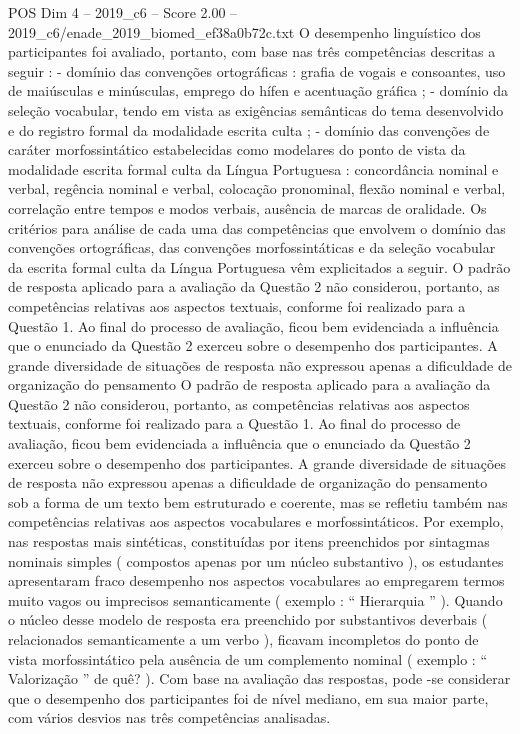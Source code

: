 \begin{textsample}{POS Dim 4 – 2019\_c6 – Score 2.00 – 2019\_c6/enade\_2019\_biomed\_ef38a0b72c.txt}
O desempenho linguístico dos participantes foi avaliado, portanto, com base nas três competências descritas a seguir : - domínio das convenções ortográficas : grafia de vogais e consoantes, uso de maiúsculas e minúsculas, emprego do hífen e acentuação gráfica ; - domínio da seleção vocabular, tendo em vista as exigências semânticas do tema desenvolvido e do registro formal da modalidade escrita culta ; - domínio das convenções de caráter morfossintático estabelecidas como modelares do ponto de vista da modalidade escrita formal culta da Língua Portuguesa : concordância nominal e verbal, regência nominal e verbal, colocação pronominal, flexão nominal e verbal, correlação entre tempos e modos verbais, ausência de marcas de oralidade.
Os critérios para análise de cada uma das competências que envolvem o domínio das convenções ortográficas, das convenções morfossintáticas e da seleção vocabular da escrita formal culta da Língua Portuguesa vêm explicitados a seguir.
O padrão de resposta aplicado para a avaliação da Questão 2 não considerou, portanto, as competências relativas aos aspectos textuais, conforme foi realizado para a Questão 1.
Ao final do processo de avaliação, ficou bem evidenciada a influência que o enunciado da Questão 2 exerceu sobre o desempenho dos participantes.
A grande diversidade de situações de resposta não expressou apenas a dificuldade de organização do pensamento O padrão de resposta aplicado para a avaliação da Questão 2 não considerou, portanto, as competências relativas aos aspectos textuais, conforme foi realizado para a Questão 1.
Ao final do processo de avaliação, ficou bem evidenciada a influência que o enunciado da Questão 2 exerceu sobre o desempenho dos participantes.
A grande diversidade de situações de resposta não expressou apenas a dificuldade de organização do pensamento sob a forma de um texto bem estruturado e coerente, mas se refletiu também nas competências relativas aos aspectos vocabulares e morfossintáticos.
Por exemplo, nas respostas mais sintéticas, constituídas por itens preenchidos por sintagmas nominais simples ( compostos apenas por um núcleo substantivo ), os estudantes apresentaram fraco desempenho nos aspectos vocabulares ao empregarem termos muito vagos ou imprecisos semanticamente ( exemplo : “ Hierarquia ” ).
Quando o núcleo desse modelo de resposta era preenchido por substantivos deverbais ( relacionados semanticamente a um verbo ), ficavam incompletos do ponto de vista morfossintático pela ausência de um complemento nominal ( exemplo : “ Valorização ” de quê? ).
Com base na avaliação das respostas, pode -se considerar que o desempenho dos participantes foi de nível mediano, em sua maior parte, com vários desvios nas três competências analisadas.

\end{textsample}

